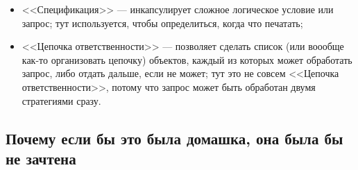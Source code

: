 \documentclass{../text-style}
\begin{document}
\begin{itemize}
\begin{itemize}
        \item <<Спецификация>> --- инкапсулирует сложное логическое условие или запрос; тут используется, чтобы определиться, когда что печатать;
        \item <<Цепочка ответственности>> --- позволяет сделать список (или воообще как-то организовать цепочку) объектов, каждый из которых может обработать запрос, либо отдать дальше, если не может; тут это не совсем <<Цепочка ответственности>>, потому что запрос может быть обработан двумя стратегиями сразу.
    \end{itemize}
\end{itemize}

\subsection{Почему если бы это была домашка, она была бы не зачтена}
\end{document}

